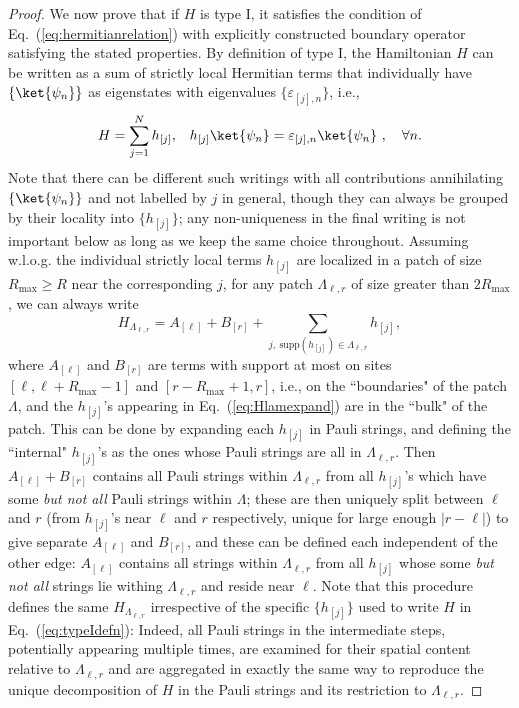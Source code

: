 \documentclass[prx,letterpaper,aps,superscriptaddress,floatfix,twocolumn,nofootinbib]{revtex4-2}
\theoremstyle{definition}
\begin{document}
\begin{proof}
%
We now prove that if $H$ is type I, it satisfies the condition of Eq.~(\ref{eq:hermitianrelation}) with explicitly constructed boundary operator satisfying the stated properties.
%
By definition of type I, the Hamiltonian $H$ can be written as a sum of strictly local Hermitian terms that individually have $\{\ket{\psi_n}\}$ as eigenstates with eigenvalues $\{\varepsilon_{[j],n}\}$, i.e.,
\begin{equation}
    H = \sum_{j = 1}^N{h_{[j]}},\;\;\;h_{[j]}\ket{\psi_n} = \varepsilon_{[j],n}\ket{\psi_n}~, \quad \forall n.
\label{eq:typeIdefn}
\end{equation}
%
Note that there can be different such writings with all contributions annihilating $\{\ket{\psi_n}\}$ and not labelled by $j$ in general, though they can always be grouped by their locality into $\{h_{[j]}\}$; any non-uniqueness in the final writing is not important below as long as we keep the same choice throughout.
%
Assuming w.l.o.g. the individual strictly local terms $h_{[j]}$ are localized in a patch of size $R_{\max} \geq R$ near the corresponding $j$, for any patch $\Lambda_{\ell,r}$ of size greater than $2 R_{\max}$, we can always write
\begin{equation}
    H_{\Lambda_{\ell,r}} = A_{[\ell]} + B_{[r]} + \sum_{j,~\text{supp}(h_{[j]}) \in \Lambda_{\ell,r}}{h_{[j]}},
\label{eq:Hlamexpand}
\end{equation}
where $A_{[\ell]}$ and $B_{[r]}$ are terms with support at most on sites $[\ell, \ell + R_{\max} -1]$ and $[r - R_{\max} + 1, r]$, i.e., on the ``boundaries" of the patch $\Lambda$, and the $h_{[j]}$'s appearing in Eq.~(\ref{eq:Hlamexpand}) are in the ``bulk" of the patch.
%
This can be done by expanding each $h_{[j]}$ in Pauli strings, and defining the ``internal" $h_{[j]}$'s as the ones whose Pauli strings are all in $\Lambda_{\ell,r}$.
%
Then $A_{[\ell]} + B_{[r]}$ contains all Pauli strings within $\Lambda_{\ell,r}$ from all $h_{[j]}$'s which have some \textit{but not all} Pauli strings within $\Lambda$; these are then uniquely split between $\ell$ and $r$ (from $h_{[j]}$'s near $\ell$ and $r$ respectively, unique for large enough $|r-\ell|$) to give separate $A_{[\ell]}$ and $B_{[r]}$, and these can be defined each independent of the other edge: $A_{[\ell]}$ contains all strings within $\Lambda_{\ell,r}$ from all $h_{[j]}$ whose some \textit{but not all} strings lie withing $\Lambda_{\ell,r}$ and reside near $\ell$.
%
Note that this procedure defines the same $H_{\Lambda_{\ell,r}}$ irrespective of the specific $\{h_{[j]}\}$ used to write $H$ in Eq.~(\ref{eq:typeIdefn}):  Indeed, all Pauli strings in the intermediate steps, potentially appearing multiple times, are examined for their spatial content relative to $\Lambda_{\ell,r}$ and are aggregated in exactly the same way to reproduce the unique decomposition of $H$ in the Pauli strings and its restriction to $\Lambda_{\ell,r}$.

\end{proof}
\end{document}
